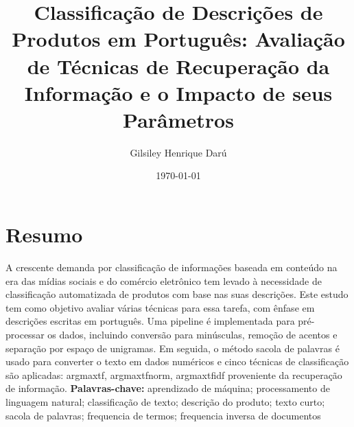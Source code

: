 \documentclass[a4paper,12pt]{report}
\begin{document}
\title{\textbf{Classificação de Descrições de Produtos em Português: Avaliação de Técnicas de Recuperação da Informação e o Impacto de seus Parâmetros}}
\author{Gilsiley Henrique Darú}

\date{\today}
\maketitle

\chapter*{Resumo}

	A crescente demanda por classificação de informações baseada em conteúdo na era das mídias sociais e do comércio eletrônico tem levado à necessidade de classificação automatizada de produtos com base nas suas descrições. Este estudo tem como objetivo avaliar várias técnicas para essa tarefa, com ênfase em descrições escritas em português. Uma pipeline é implementada para pré-processar os dados, incluindo conversão para minúsculas, remoção de acentos e separação por espaço de unigramas. Em seguida, o método sacola de palavras é usado para converter o texto em dados numéricos e cinco técnicas de classificação são aplicadas: argmaxtf, argmaxtfnorm, argmaxtfidf proveniente da recuperação de informação.           
				\vspace{0.15cm}
        \noindent \textbf{Palavras-chave:} aprendizado de máquina; processamento de linguagem natural; classificação de texto; descrição do produto; texto curto; sacola de palavras; frequencia de termos; frequencia inversa de documentos

	
     

\tableofcontents














\end{document}
